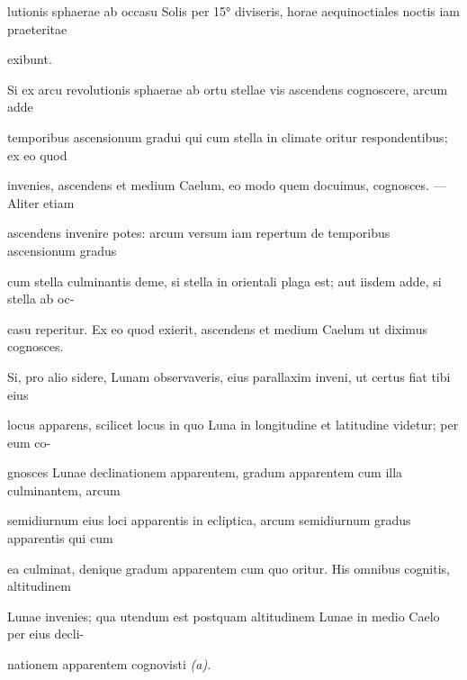 \documentclass[11pt]{article}
\begin{document}
\noindent\hypertarget{AB01-PDF0123-body-L020}{}lutionis sphaerae ab occasu Solis per 15° diviseris, horae aequinoctiales noctis iam praeteritae\strut\par
\noindent\hypertarget{AB01-PDF0123-body-L021}{}exibunt.\strut\par
\noindent\hypertarget{AB01-PDF0123-body-L022}{}Si ex arcu revolutionis sphaerae ab ortu stellae vis ascendens cognoscere, arcum adde\strut\par
\noindent\hypertarget{AB01-PDF0123-body-L023}{}temporibus ascensionum gradui qui cum stella in climate oritur respondentibus; ex eo quod\strut\par
\noindent\hypertarget{AB01-PDF0123-body-L024}{}invenies, ascendens et medium Caelum, eo modo quem docuimus, cognosces. — Aliter etiam\strut\par
\noindent\hypertarget{AB01-PDF0123-body-L025}{}ascendens invenire potes: arcum versum iam repertum de temporibus ascensionum gradus\strut\par
\noindent\hypertarget{AB01-PDF0123-body-L026}{}cum stella culminantis deme, si stella in orientali plaga est; aut iisdem adde, si stella ab oc-\strut\par
\noindent\hypertarget{AB01-PDF0123-body-L027}{}casu reperitur. Ex eo quod exierit, ascendens et medium Caelum ut diximus cognosces.\strut\par
\noindent\hypertarget{AB01-PDF0123-body-L028}{}Si, pro alio sidere, Lunam observaveris, eius parallaxim inveni, ut certus fiat tibi eius\strut\par
\noindent\hypertarget{AB01-PDF0123-body-L029}{}locus apparens, scilicet locus in quo Luna in longitudine et latitudine videtur; per eum co-\strut\par
\noindent\hypertarget{AB01-PDF0123-body-L030}{}gnosces Lunae declinationem apparentem, gradum apparentem cum illa culminantem, arcum\strut\par
\noindent\hypertarget{AB01-PDF0123-body-L031}{}semidiurnum eius loci apparentis in ecliptica, arcum semidiurnum gradus apparentis qui cum\strut\par
\noindent\hypertarget{AB01-PDF0123-body-L032}{}ea culminat, denique gradum apparentem cum quo oritur. His omnibus cognitis, altitudinem\strut\par
\noindent\hypertarget{AB01-PDF0123-body-L033}{}Lunae invenies; qua utendum est postquam altitudinem Lunae in medio Caelo per eius decli-\strut\par
\noindent\hypertarget{AB01-PDF0123-body-L034}{}nationem apparentem cognovisti \textit{(a)}.\strut\par
\end{document}
